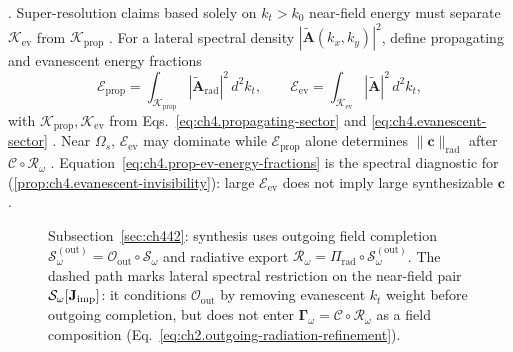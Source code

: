 \cite{stratton1941}. Super-resolution claims based solely on \(k_{t}>k_{0}\) near-field energy must
separate \(\mathcal{K}_{\mathrm{ev}}\) from \(\mathcal{K}_{\mathrm{prop}}\) \cite{harrington2001}.
For a lateral spectral density \(|\widetilde{\mathbf{A}}(k_{x},k_{y})|^{2}\), define propagating and evanescent
energy fractions
\begin{equation}
\label{eq:ch4.prop-ev-energy-fractions}
\mathcal{E}_{\mathrm{prop}}
=
\int_{\mathcal{K}_{\mathrm{prop}}}\!
|\widetilde{\mathbf{A}}_{\mathrm{rad}}|^{2}\,d^{2}k_{t},
\qquad
\mathcal{E}_{\mathrm{ev}}
=
\int_{\mathcal{K}_{\mathrm{ev}}}\!
|\widetilde{\mathbf{A}}|^{2}\,d^{2}k_{t},
\end{equation}
with \(\mathcal{K}_{\mathrm{prop}},\mathcal{K}_{\mathrm{ev}}\) from Eqs.~\eqref{eq:ch4.propagating-sector} and
\eqref{eq:ch4.evanescent-sector} \cite{stratton1941}. Near \(\Omega_{s}\), \(\mathcal{E}_{\mathrm{ev}}\)
may dominate while \(\mathcal{E}_{\mathrm{prop}}\) alone determines \(\|\mathbf{c}\|_{\mathrm{rad}}\) after
\(\mathcal{C}\circ\mathcal{R}_\omega\) \cite{harrington2001}. Equation~\eqref{eq:ch4.prop-ev-energy-fractions}
is the spectral diagnostic for (\ref{prop:ch4.evanescent-invisibility}): large \(\mathcal{E}_{\mathrm{ev}}\)
does not imply large synthesizable \(\mathbf{c}\) \cite{devaney2004}.
\begin{figure}[t]
\centering
{}
\caption{Subsection~\ref{sec:ch442}: synthesis uses outgoing field completion
$\mathcal{S}_\omega^{(\mathrm{out})}=\mathcal{O}_{\mathrm{out}}\circ\mathcal{S}_\omega$ and radiative export
$\mathcal{R}_\omega=\Pi_{\mathrm{rad}}\circ\mathcal{S}_\omega^{(\mathrm{out})}$.
The dashed path marks lateral spectral restriction on the near-field pair $\mathcal{S}_\omega[\mathbf{J}_{\mathrm{imp}}]$: it conditions
$\mathcal{O}_{\mathrm{out}}$ by removing evanescent $k_t$ weight before outgoing completion, but does not enter
$\boldsymbol{\Gamma}_\omega=\mathcal{C}\circ\mathcal{R}_\omega$ as a field composition (Eq.~\eqref{eq:ch2.outgoing-radiation-refinement}).}
\label{fig:ch4.prop-ev-partition}
\end{figure}
